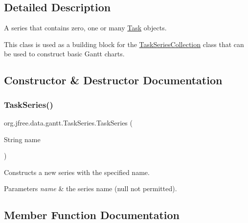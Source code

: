 \subsection{Detailed Description}
A series that contains zero, one or many \mbox{\hyperlink{classorg_1_1jfree_1_1data_1_1gantt_1_1_task}{Task}} objects. 

This class is used as a building block for the \mbox{\hyperlink{classorg_1_1jfree_1_1data_1_1gantt_1_1_task_series_collection}{Task\+Series\+Collection}} class that can be used to construct basic Gantt charts. 

\subsection{Constructor \& Destructor Documentation}
\mbox{\label{classorg_1_1jfree_1_1data_1_1gantt_1_1_task_series_a65754ab6d0f03cf8b367a6b401678137}} 
\subsubsection{\texorpdfstring{Task\+Series()}{TaskSeries()}}
{\footnotesize\ttfamily org.\+jfree.\+data.\+gantt.\+Task\+Series.\+Task\+Series (\begin{DoxyParamCaption}\item[{String}]{name }\end{DoxyParamCaption})}

Constructs a new series with the specified name.


\begin{DoxyParams}{Parameters}
{\em name} & the series name ({\ttfamily null} not permitted). \\
\hline
\end{DoxyParams}


\subsection{Member Function Documentation}
\mbox{\label{classorg_1_1jfree_1_1data_1_1gantt_1_1_task_series_a10d6000137c485fb4927ee63ef413755}} 
